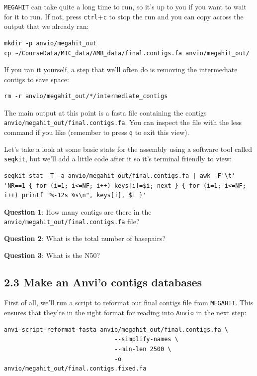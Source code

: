 \documentclass[
]{book}
\begin{document}
\texttt{MEGAHIT} can take quite a long time to run, so it's up to you if you want to wait for it to run. If not, press \texttt{ctrl}+\texttt{c} to stop the run and you can copy across the output that we already ran:

\begin{verbatim}
mkdir -p anvio/megahit_out
cp ~/CourseData/MIC_data/AMB_data/final.contigs.fa anvio/megahit_out/
\end{verbatim}

If you ran it yourself, a step that we'll often do is removing the intermediate contigs to save space:

\begin{verbatim}
rm -r anvio/megahit_out/*/intermediate_contigs
\end{verbatim}

The main output at this point is a fasta file containing the contigs \texttt{anvio/megahit\_out/final.contigs.fa}. You can inspect the file with the less command if you like (remember to press \texttt{q} to exit this view).

Let's take a look at some basic stats for the assembly using a software tool called \texttt{seqkit}, but we'll add a little code after it so it's terminal friendly to view:

\begin{verbatim}
seqkit stat -T -a anvio/megahit_out/final.contigs.fa | awk -F'\t' 'NR==1 { for (i=1; i<=NF; i++) keys[i]=$i; next } { for (i=1; i<=NF; i++) printf "%-12s %s\n", keys[i], $i }'
\end{verbatim}

\textbf{Question 1}: How many contigs are there in the \texttt{anvio/megahit\_out/final.contigs.fa} file?

\textbf{Question 2}: What is the total number of basepairs?

\textbf{Question 3}: What is the N50?

\subsection{2.3 Make an Anvi'o contigs databases}\label{make-an-anvio-contigs-databases}

First of all, we'll run a script to reformat our final contigs file from \texttt{MEGAHIT}. This ensures that they're in the right format for reading into \texttt{Anvi\textquotesingle{}o} in the next step:

\begin{verbatim}
anvi-script-reformat-fasta anvio/megahit_out/final.contigs.fa \
                               --simplify-names \
                               --min-len 2500 \
                               -o anvio/megahit_out/final.contigs.fixed.fa
\end{verbatim}
\end{document}
